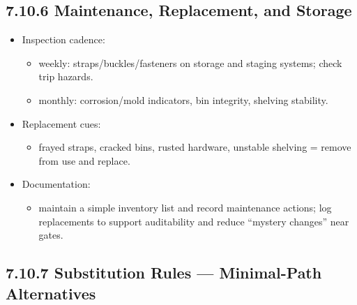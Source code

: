 \documentclass[10pt]{article}
\begin{document}
\subsection*{7.10.6 Maintenance, Replacement, and Storage}
{}

\begin{itemize}
\item Inspection cadence:
  \begin{itemize}
  \item weekly: straps/buckles/fasteners on storage and staging systems; check trip hazards.
  \item monthly: corrosion/mold indicators, bin integrity, shelving stability.
  \end{itemize}
\item Replacement cues:
  \begin{itemize}
  \item frayed straps, cracked bins, rusted hardware, unstable shelving = remove from use and replace.
  \end{itemize}
\item Documentation:
  \begin{itemize}
  \item maintain a simple inventory list and record maintenance actions; log replacements to support auditability and reduce “mystery changes” near gates.
  \end{itemize}
\end{itemize}

\subsection*{7.10.7 Substitution Rules — Minimal-Path Alternatives}
{}
\end{document}
